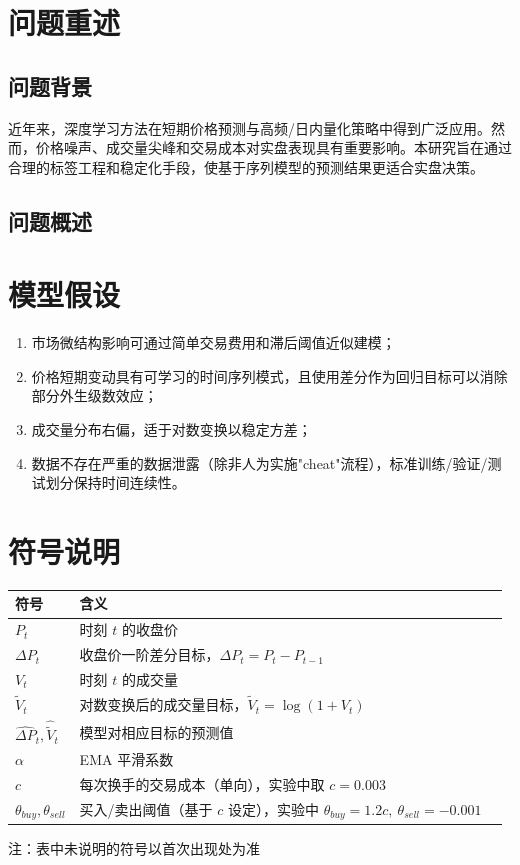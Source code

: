 \documentclass[withoutpreface,bwprint]{cumcmthesis}
\begin{document}
\section{问题重述}
\subsection{问题背景}

近年来，深度学习方法在短期价格预测与高频/日内量化策略中得到广泛应用。然而，价格噪声、成交量尖峰和交易成本对实盘表现具有重要影响。本研究旨在通过合理的标签工程和稳定化手段，使基于序列模型的预测结果更适合实盘决策。

\subsection{问题概述}


\section{模型假设}
\begin{enumerate}
    \item 市场微结构影响可通过简单交易费用和滞后阈值近似建模；
    \item 价格短期变动具有可学习的时间序列模式，且使用差分作为回归目标可以消除部分外生级数效应；
    \item 成交量分布右偏，适于对数变换以稳定方差；
    \item 数据不存在严重的数据泄露（除非人为实施"cheat"流程），标准训练/验证/测试划分保持时间连续性。
\end{enumerate}

\section{符号说明}
\begin{table}[!h]
    \centering
    \begin{tabular}{p{2.5cm}<{\centering}p{12cm}<{\centering}p{2.5cm}<{\centering}}
    \toprule[1.5pt]
    符号 & 含义\\
    \midrule[1pt]
    $P_t$ & 时刻 $t$ 的收盘价\\
    $\Delta P_t$ & 收盘价一阶差分目标，$\Delta P_t = P_t - P_{t-1}$\\
    $V_t$ & 时刻 $t$ 的成交量\\
    $\widetilde{V}_t$ & 对数变换后的成交量目标，$\widetilde{V}_t = \log(1+V_t)$\\
    $\hat{\Delta P}_t, \hat{\widetilde{V}}_t$ & 模型对相应目标的预测值\\
    $\alpha$ & EMA 平滑系数\\
    $c$ & 每次换手的交易成本（单向），实验中取 $c=0.003$\\
    $\theta_{buy},\theta_{sell}$ & 买入/卖出阈值（基于 $c$ 设定），实验中 $\theta_{buy}=1.2c,\ \theta_{sell}=-0.001$\\
    \bottomrule[1.5pt]
    \end{tabular}
\end{table}
注：表中未说明的符号以首次出现处为准
\end{document}
